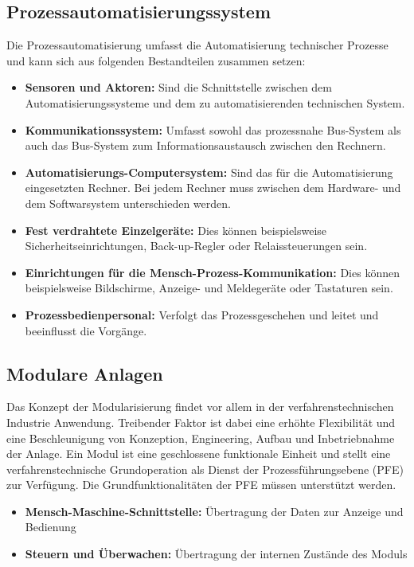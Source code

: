 \subsection{Prozessautomatisierungssystem}
Die Prozessautomatisierung umfasst die Automatisierung technischer Prozesse und kann sich aus folgenden Bestandteilen zusammen setzen:
\begin{itemize}
\item \textbf{Sensoren und Aktoren:} Sind die Schnittstelle zwischen dem Automatisierungssysteme und dem zu automatisierenden technischen System.
\item \textbf{Kommunikationssystem:} Umfasst sowohl das prozessnahe Bus-System als auch das Bus-System zum Informationsaustausch zwischen den Rechnern.
\item \textbf{Automatisierungs-Computersystem:} Sind das für die Automatisierung eingesetzten Rechner. Bei jedem Rechner muss zwischen dem Hardware- und dem Softwarsystem unterschieden werden.
\item \textbf{Fest verdrahtete Einzelgeräte:} Dies können beispielsweise Sicherheitseinrichtungen, Back-up-Regler oder Relaissteuerungen sein.
\item \textbf{Einrichtungen für die Mensch-Prozess-Kommunikation:} Dies können beispielsweise Bildschirme, Anzeige- und Meldegeräte oder Tastaturen sein.
\item \textbf{Prozessbedienpersonal:} Verfolgt das Prozessgeschehen und leitet und beeinflusst die Vorgänge.
\end{itemize}

\subsection{Modulare Anlagen}
\label{2:Modulare-Anlagen}
Das Konzept der Modularisierung findet vor allem in der verfahrenstechnischen Industrie Anwendung. Treibender Faktor ist dabei eine erhöhte Flexibilität und eine Beschleunigung von Konzeption, Engineering, Aufbau und Inbetriebnahme der Anlage\cite{Urbas2012}. Ein Modul ist eine geschlossene funktionale Einheit und stellt eine verfahrenstechnische Grundoperation als Dienst der Prozessführungsebene (PFE) zur Verfügung. Die Grundfunktionalitäten der PFE müssen unterstützt werden. \cite{Bernshausen2016}
\begin{itemize}
\item \textbf{Mensch-Maschine-Schnittstelle:} Übertragung der Daten zur Anzeige und Bedienung
\item \textbf{Steuern und Überwachen:} Übertragung der internen Zustände des Moduls
\end{itemize}

